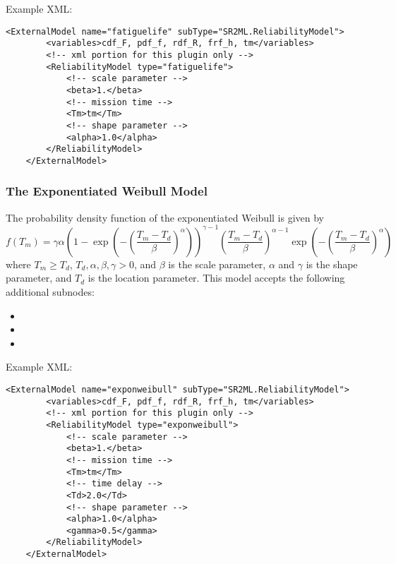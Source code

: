 Example XML:
\begin{lstlisting}[style=XML]
	<ExternalModel name="fatiguelife" subType="SR2ML.ReliabilityModel">
		<variables>cdf_F, pdf_f, rdf_R, frf_h, tm</variables>
		<!-- xml portion for this plugin only -->
		<ReliabilityModel type="fatiguelife">
			<!-- scale parameter -->
			<beta>1.</beta>
			<!-- mission time -->
			<Tm>tm</Tm>
			<!-- shape parameter -->
			<alpha>1.0</alpha>
		</ReliabilityModel>
	</ExternalModel>
\end{lstlisting}


\subsubsection{The Exponentiated Weibull Model}
The probability density function of the exponentiated Weibull is given by
\begin{equation}
	f(T_m) = \gamma\alpha\left(1-\exp\left(-\left(\frac{T_m-T_d}{\beta}\right)^\alpha\right)\right)^{\gamma-1}
				 \left(\frac{T_m-T_d}{\beta}\right)^{\alpha-1}\exp\left(-\left(\frac{T_m-T_d}{\beta}\right)^\alpha\right)
\end{equation}
where $T_m\geq T_d$, $T_d, \alpha, \beta, \gamma>0$, and $\beta$ is the scale parameter, $\alpha$ and $\gamma$ is the shape
parameter, and $T_d$ is the location parameter.
This model accepts the following additional subnodes:
\begin{itemize}
	\item {}
	\item {}
	\item {}
\end{itemize}

Example XML:
\begin{lstlisting}[style=XML]
	<ExternalModel name="exponweibull" subType="SR2ML.ReliabilityModel">
		<variables>cdf_F, pdf_f, rdf_R, frf_h, tm</variables>
		<!-- xml portion for this plugin only -->
		<ReliabilityModel type="exponweibull">
			<!-- scale parameter -->
			<beta>1.</beta>
			<!-- mission time -->
			<Tm>tm</Tm>
			<!-- time delay -->
			<Td>2.0</Td>
			<!-- shape parameter -->
			<alpha>1.0</alpha>
			<gamma>0.5</gamma>
		</ReliabilityModel>
	</ExternalModel>
\end{lstlisting}


